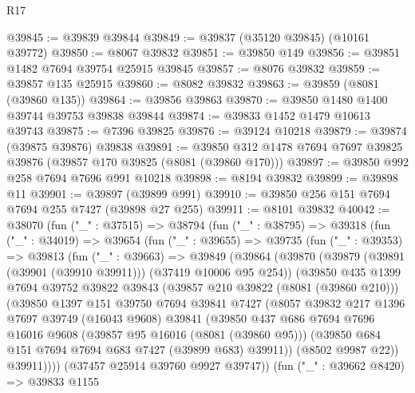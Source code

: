 \begin{lexlean}{R17}
\begin{coremodule}
@39845 := @39839 @39844
@39849 := @39837 (@35120 @39845) (@10161 @39772)
@39850 := @8067 @39832
@39851 := @39850 @149
@39856 := @39851 @1482 @7694 @39754 @25915 @39845
@39857 := @8076 @39832
@39859 := @39857 @135 @25915
@39860 := @8082 @39832
@39863 := @39859 (@8081 (@39860 @135))
@39864 := @39856 @39863
@39870 := @39850 @1480 @1400 @39744 @39753 @39838 @39844
@39874 := @39833 @1452 @1479 @10613 @39743
@39875 := @7396 @39825
@39876 := @39124 @10218
@39879 := @39874 (@39875 @39876) @39838
@39891 := @39850 @312 @1478 @7694 @7697 @39825 @39876 (@39857 @170 @39825 (@8081 (@39860 @170)))
@39897 := @39850 @992 @258 @7694 @7696 @991 @10218
@39898 := @8194 @39832
@39899 := @39898 @11
@39901 := @39897 (@39899 @991)
@39910 := @39850 @256 @151 @7694 @7694 @255 @7427 (@39898 @27 @255)
@39911 := @8101 @39832
@40042 := @38070
    (fun ("_" : @37515) =>
    @38794
      (fun ("_" : @38795) =>
      @39318
        (fun ("_" : @34019) =>
        @39654
          (fun ("_" : @39655) =>
          @39735
            (fun ("_" : @39353) =>
            @39813
              (fun ("_" : @39663) =>
              @39849
                (@39864
                  (@39870
                    (@39879 (@39891 (@39901 (@39910 @39911))) (@37419 @10006 @95 @254))
                    (@39850
                      @435
                      @1399
                      @7694
                      @39752
                      @39822
                      @39843
                      (@39857 @210 @39822 (@8081 (@39860 @210)))
                      (@39850
                        @1397
                        @151
                        @39750
                        @7694
                        @39841
                        @7427
                        (@8057
                          @39832
                          @217
                          @1396
                          @7697
                          @39749
                          (@16043 @9608)
                          @39841
                          (@39850
                            @437
                            @686
                            @7694
                            @7696
                            @16016
                            @9608
                            (@39857 @95 @16016 (@8081 (@39860 @95)))
                            (@39850 @684 @151 @7694 @7694 @683 @7427 (@39899 @683) @39911))
                          (@8502 @9987 @22))
                        @39911))))
                (@37457 @25914 @39760 @9927 @39747))
              (fun ("_" : @39662 @8420) =>
              @39833
                @1155

\end{coremodule}
\end{lexlean}
